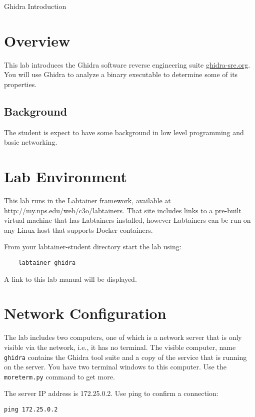 


\begin{center}
{\LARGE Ghidra Introduction}
\vspace{0.1in}\\
\end{center}


\section{Overview}
This lab introduces the Ghidra software reverse engineering suite \url{ghidra-sre.org}.
You will use Ghidra to analyze a binary executable to determine some of its properties.

\subsection {Background}
The student is expect to have some background in low level programming and basic networking.

\section{Lab Environment}
This lab runs in the Labtainer framework,
available at http://my.nps.edu/web/c3o/labtainers.
That site includes links to a pre-built virtual machine
that has Labtainers installed, however Labtainers can
be run on any Linux host that supports Docker containers.

From your labtainer-student directory start the lab using:
\begin{verbatim}
    labtainer ghidra
\end{verbatim}
\noindent A link to this lab manual will be displayed.  

\section{Network Configuration}
The lab includes two computers, one of which is a network server that is
only visible via the network, i.e., it has no terminal.  The visible computer,
name {\tt ghidra} contains the Ghidra tool suite and a copy of the service that
is running on the server.  You have two terminal windows to this computer. Use the
{\tt moreterm.py} command to get more.

The server IP address is 172.25.0.2.  Use ping to confirm a connection:
\begin{verbatim}
ping 172.25.0.2
\end{verbatim}

